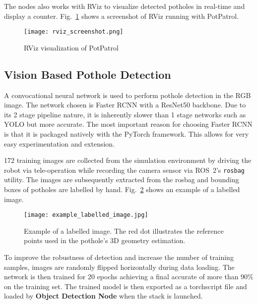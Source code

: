 \documentclass[conference]{IEEEtran}
\begin{document}
The nodes also works with RViz to visualize detected potholes in real-time and display a counter. Fig.~\ref{fig:rviz_visualisation} shows a screenshot of RViz running with PotPatrol.

\begin{figure}
    \centering
    \texttt{[image: rviz\_screenshot.png]}
    \caption{RViz visualization of PotPatrol}
    \label{fig:rviz_visualisation}
\end{figure}

\subsection{Vision Based Pothole Detection}

A convocational neural network is used to perform pothole detection in the RGB image. The network chosen is Faster RCNN\cite{renFasterRCNNRealTime2016} with a ResNet50\cite{heDeepResidualLearning2015} backbone. Due to its 2 stage pipeline nature, it is inherently slower than 1 stage networks such as YOLO\cite{redmonYOLOv3IncrementalImprovement2018} but more accurate. The most important reason for choosing Faster RCNN is that it is packaged natively with the PyTorch framework. This allows for very easy experimentation and extension.

172 training images are collected from the simulation environment by driving the robot via tele-operation while recording the camera sensor via ROS~2's \verb|rosbag| utility. The images are subsequently extracted from the rosbag and bounding boxes of potholes are labelled by hand. Fig.~\ref{fig:example_labelled_image} shows an example of a labelled image.

\begin{figure}[ht]
    \centering
    \texttt{[image: example\_labelled\_image.jpg]}
    \caption{Example of a labelled image. The red dot illustrates the reference points used in the pothole's 3D geometry estimation.}
    \label{fig:example_labelled_image}
\end{figure}

To improve the robustness of detection and increase the number of training samples, images are randomly flipped horizontally during data loading. The network is then trained for 20 epochs achieving a final accurate of more than 90\% on the training set. The trained model is then exported as a torchscript file and loaded by \textbf{Object Detection Node} when the stack is launched.
\end{document}

